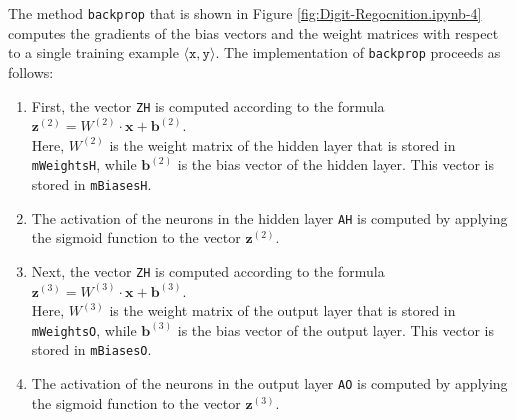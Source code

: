The method \texttt{backprop} that is shown in Figure \ref{fig:Digit-Regocnition.ipynb-4} computes the gradients
of the bias vectors and the weight matrices with respect to 
a single training example $\langle \texttt{x}, \texttt{y} \rangle$.  The implementation of \texttt{backprop}
proceeds as follows:
\begin{enumerate}
\item First, the vector \texttt{ZH} is computed according to the formula
      \\[0.2cm]
      \hspace*{1.3cm}
      $\mathbf{z}^{(2)} = W^{(2)} \cdot \mathbf{x} + \mathbf{b}^{(2)}$.
      \\[0.2cm]
      Here, $W^{(2)}$ is the weight matrix of the hidden layer that is stored in \texttt{mWeightsH}, while
      $\mathbf{b}^{(2)}$ is the bias vector of the hidden layer.  This vector is stored in \texttt{mBiasesH}.
\item The activation of the neurons in the hidden layer \texttt{AH} is computed by applying the sigmoid
      function to the vector $\mathbf{z}^{(2)}$.
\item Next, the vector \texttt{ZH} is computed according to the formula
      \\[0.2cm]
      \hspace*{1.3cm}
      $\mathbf{z}^{(3)} = W^{(3)} \cdot \mathbf{x} + \mathbf{b}^{(3)}$.
      \\[0.2cm]
      Here, $W^{(3)}$ is the weight matrix of the output layer that is stored in \texttt{mWeightsO}, while
      $\mathbf{b}^{(3)}$ is the bias vector of the output layer.  This vector is stored in \texttt{mBiasesO}.
\item The activation of the neurons in the output layer \texttt{AO} is computed by applying the sigmoid
      function to the vector $\mathbf{z}^{(3)}$.


\end{enumerate}

